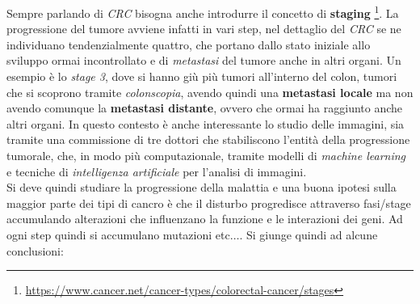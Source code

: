 \documentclass[a4paper,12pt, oneside]{book}
\begin{document}
Sempre parlando di \textit{CRC} bisogna anche introdurre il concetto di
\textbf{staging}
\footnote{\url{https://www.cancer.net/cancer-types/colorectal-cancer/stages}}.
La progressione del tumore avviene infatti in vari step, nel 
dettaglio del \textit{CRC} se ne individuano tendenzialmente quattro, che
portano dallo stato iniziale allo sviluppo ormai incontrollato e di
\textit{metastasi} del tumore anche in altri organi. Un esempio è lo
\textit{stage 3}, dove si hanno giù più tumori all'interno del colon, tumori che
si scoprono tramite \textit{colonscopia}, avendo quindi una \textbf{metastasi
  locale} ma non avendo comunque la \textbf{metastasi distante}, ovvero che
ormai ha raggiunto anche altri organi. In questo contesto è anche interessante
lo studio delle immagini, sia tramite una commissione di tre dottori che
stabiliscono l'entità della progressione tumorale, che, in modo più
computazionale, tramite modelli di \textit{machine learning} e tecniche di
\textit{intelligenza artificiale} per l'analisi di immagini.\\
Si deve quindi studiare la progressione della malattia e una buona ipotesi sulla
maggior parte dei tipi di cancro è che il disturbo progredisce attraverso
fasi/stage accumulando alterazioni che influenzano la funzione e le interazioni
dei geni. Ad ogni step quindi si accumulano mutazioni etc$\ldots$. Si giunge
quindi ad alcune conclusioni:
\end{document}
